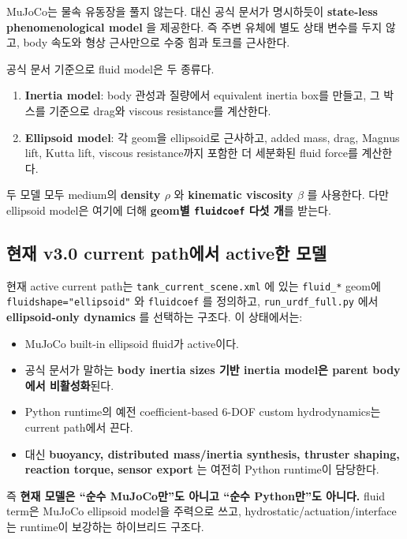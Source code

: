 \documentclass[11pt,a4paper]{article}
\newcommand{\code}[1]{\nolinkurl{#1}}
\begin{document}
MuJoCo는 물속 유동장을 풀지 않는다. 대신 공식 문서가 명시하듯이 \textbf{state-less phenomenological model} 을 제공한다. 즉 주변 유체에 별도 상태 변수를 두지 않고, body 속도와 형상 근사만으로 수중 힘과 토크를 근사한다.

공식 문서 기준으로 fluid model은 두 종류다.

\begin{enumerate}[leftmargin=2em]
  \item \textbf{Inertia model}: body 관성과 질량에서 equivalent inertia box를 만들고, 그 박스를 기준으로 drag와 viscous resistance를 계산한다.
  \item \textbf{Ellipsoid model}: 각 geom을 ellipsoid로 근사하고, added mass, drag, Magnus lift, Kutta lift, viscous resistance까지 포함한 더 세분화된 fluid force를 계산한다.
\end{enumerate}

두 모델 모두 medium의 \textbf{density \(\rho\)} 와 \textbf{kinematic viscosity \(\beta\)} 를 사용한다. 다만 ellipsoid model은 여기에 더해 \textbf{geom별 \code{fluidcoef} 다섯 개}를 받는다.

\subsection{현재 v3.0 current path에서 active한 모델}

현재 active current path는 \code{tank\_current\_scene.xml} 에 있는 \code{fluid\_*} geom에 \code{fluidshape="ellipsoid"} 와 \code{fluidcoef} 를 정의하고, \code{run\_urdf\_full.py} 에서 \textbf{ellipsoid-only dynamics} 를 선택하는 구조다. 이 상태에서는:

\begin{itemize}[leftmargin=2em]
  \item MuJoCo built-in ellipsoid fluid가 active이다.
  \item 공식 문서가 말하는 \textbf{body inertia sizes 기반 inertia model은 parent body에서 비활성화}된다.
  \item Python runtime의 예전 coefficient-based 6-DOF custom hydrodynamics는 current path에서 끈다.
  \item 대신 \textbf{buoyancy, distributed mass/inertia synthesis, thruster shaping, reaction torque, sensor export} 는 여전히 Python runtime이 담당한다.
\end{itemize}

즉 \textbf{현재 모델은 ``순수 MuJoCo만''도 아니고 ``순수 Python만''도 아니다.} fluid term은 MuJoCo ellipsoid model을 주력으로 쓰고, hydrostatic/actuation/interface는 runtime이 보강하는 하이브리드 구조다.
\end{document}
